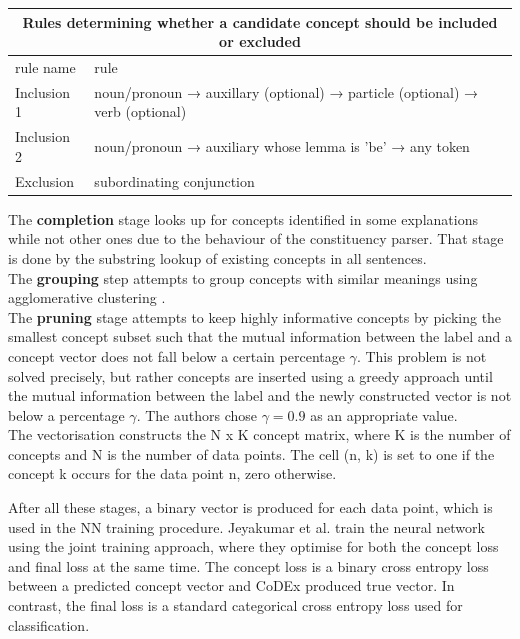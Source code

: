 \begin{center}
\begin{tabular}{ |p{2cm}|p{12cm}|  }
 \hline
 \multicolumn{2}{|c|}{Rules determining whether a candidate concept should be included or excluded} \\
 \hline
 rule name & rule \\
 \hline
 Inclusion 1 & noun/pronoun → auxillary (optional) → particle (optional) → verb (optional) \\
 Inclusion 2 & noun/pronoun → auxiliary whose lemma is 'be' → any token \\
 Exclusion & subordinating conjunction \\
 
 \hline
 
\end{tabular}
\label{inclusion-exclusion-rules}
\end{center}

The \textbf{completion} stage looks up for concepts identified in some explanations while not other ones due to the behaviour of the constituency parser.
That stage is done by the substring lookup of existing concepts in all sentences. \\
The \textbf{grouping} step attempts to group concepts with similar meanings using agglomerative clustering \cite{RefWorks:RefID:13-mullner2011modern}.  \\
The \textbf{pruning} stage attempts to keep highly informative concepts by picking the smallest concept subset such that the mutual information \cite{RefWorks:RefID:30-mackay2004information} between the label and a concept vector does not fall below a certain percentage $\gamma$.
This problem is not solved precisely, but rather concepts are inserted using a greedy approach until the mutual information between the label and the newly constructed vector is not below a percentage $\gamma$. The authors chose $\gamma = 0.9$ as an appropriate value. \\
The vectorisation constructs the N x K concept matrix, where K is the number of concepts and N is the number of data points. 
The cell (n, k) is set to one if the concept k occurs for the data point n, zero otherwise.

After all these stages, a binary vector is produced for each data point, which is used in the NN training procedure.
Jeyakumar et al. train the neural network using the joint training approach, where they optimise for both the concept loss and final loss at the same time.
The concept loss is a binary cross entropy loss between a predicted concept vector and CoDEx produced true vector. In contrast, the final loss is a standard categorical cross entropy loss used for classification.

